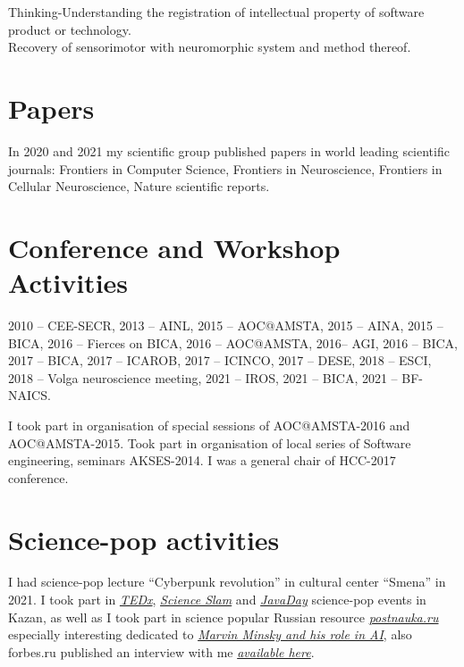\documentclass{moderncv}
\begin{document}
Thinking-Understanding the registration of intellectual property of software product or technology.\\
Recovery of sensorimotor  with neuromorphic system and method thereof.

\section{Papers}
In 2020 and 2021 my scientific group published papers in world leading scientific journals:
Frontiers in Computer Science, Frontiers in Neuroscience, Frontiers in Cellular Neuroscience, Nature scientific reports.

 

\cvitem{}{}

\section{Conference and Workshop Activities}

2010 -- CEE-SECR, 2013 -- AINL, 2015 -- AOC@AMSTA, 2015 -- AINA, 2015 -- BICA, 2016 -- Fierces on BICA, 2016 -- AOC@AMSTA, 2016-- AGI, 2016 -- BICA, 2017 -- BICA, 2017 -- ICAROB, 2017 -- ICINCO, 2017 -- DESE, 2018 -- ESCI, 2018 -- Volga neuroscience meeting, 2021 -- IROS, 2021 -- BICA, 2021 -- BF-NAICS. 

I took part in organisation of special sessions of AOC@AMSTA-2016 and AOC@AMSTA-2015. Took part in organisation of local series of Software engineering, seminars AKSES-2014. I was a general chair of HCC-2017 conference.

\section{Science-pop activities}
I had science-pop lecture ``Cyberpunk revolution'' in cultural center ``Smena'' in 2021.
I took part in \href{https://www.youtube.com/watch?v=BLvS7h3kRbo}{\emph{TEDx}}, \href{https://vk.com/video-87488544_171504962}{\emph{Science Slam}} and \href{https://www.youtube.com/watch?v=sLLKxvUEA7E}{\emph{JavaDay}} science-pop events in Kazan, as well as I took part in science popular Russian resource \href{https://postnauka.ru/author/talanov}{\emph{postnauka.ru}} especially interesting dedicated to \href{https://postnauka.ru/faq/58727}{\emph{Marvin Minsky and his role in AI}}, also forbes.ru published an interview with me \href{http://www.forbes.ru/mneniya-column/288097-kak-sozdat-emotsionalnyi-iskusstvennyi-intellekt}{\emph{available here}}.
\end{document}
